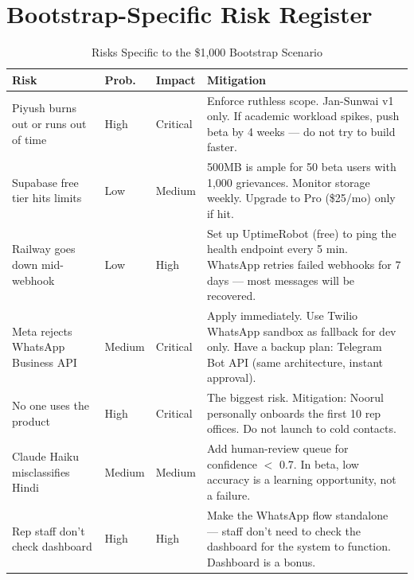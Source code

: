 \documentclass[12pt, a4paper]{article}
\begin{document}
\newpage

\section{Bootstrap-Specific Risk Register}

\begin{table}[ht]
\centering
\caption{Risks Specific to the \$1,000 Bootstrap Scenario}
\renewcommand{\arraystretch}{1.5}
\begin{tabularx}{\textwidth}{X p{1.5cm} p{1.5cm} X}
\toprule
\rowcolor{pollitylightblue}
\textbf{Risk} & \textbf{Prob.} & \textbf{Impact} & \textbf{Mitigation} \\
\midrule
Piyush burns out or runs out of time & High & Critical & Enforce ruthless scope. Jan-Sunwai v1 only. If academic workload spikes, push beta by 4 weeks --- do not try to build faster. \\
Supabase free tier hits limits & Low & Medium & 500MB is ample for 50 beta users with 1,000 grievances. Monitor storage weekly. Upgrade to Pro (\$25/mo) only if hit. \\
Railway goes down mid-webhook & Low & High & Set up UptimeRobot (free) to ping the health endpoint every 5 min. WhatsApp retries failed webhooks for 7 days --- most messages will be recovered. \\
Meta rejects WhatsApp Business API & Medium & Critical & Apply immediately. Use Twilio WhatsApp sandbox as fallback for dev only. Have a backup plan: Telegram Bot API (same architecture, instant approval). \\
No one uses the product & High & Critical & The biggest risk. Mitigation: Noorul personally onboards the first 10 rep offices. Do not launch to cold contacts. \\
Claude Haiku misclassifies Hindi & Medium & Medium & Add human-review queue for confidence $<$ 0.7. In beta, low accuracy is a learning opportunity, not a failure. \\
Rep staff don't check dashboard & High & High & Make the WhatsApp flow standalone --- staff don't need to check the dashboard for the system to function. Dashboard is a bonus. \\
\bottomrule
\end{tabularx}
\end{table}

\newpage
\end{document}

